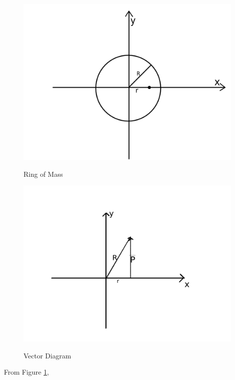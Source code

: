 \begin{figure}[!tbp] 

\centering
\begin{minipage}[b]{0.3\textwidth}
\label{ring}
\includegraphics[width=\textwidth]{fig2}
\caption{Ring of Mass}
\end{minipage}
\hfill
\begin{minipage}[b]{0.3\textwidth}
\label{vectordiagram}
\includegraphics[width=\textwidth]{fig1}
\caption{Vector Diagram}
\end{minipage}
\end{figure}

From Figure \ref{vectordiagram}, 

